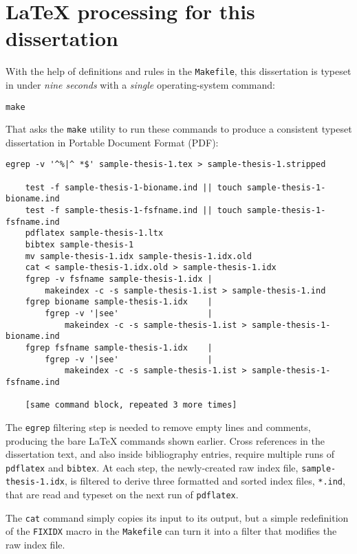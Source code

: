 
\chapter* {\LaTeX{} processing for this dissertation}

With the help of definitions and rules in the \texttt{Makefile}, this
dissertation is typeset in under \emph{nine seconds} with a \emph{single}
operating-system command:

\begin{Verbatim}[formatcom = \color{blue}]
    make
\end{Verbatim}

\noindent
That asks the \texttt{make} utility to run these commands to produce a
consistent typeset dissertation in Portable Document Format (PDF):

\begin{Verbatim}[formatcom = \color{blue}]
    egrep -v '^%|^ *$' sample-thesis-1.tex > sample-thesis-1.stripped

    test -f sample-thesis-1-bioname.ind || touch sample-thesis-1-bioname.ind
    test -f sample-thesis-1-fsfname.ind || touch sample-thesis-1-fsfname.ind
    pdflatex sample-thesis-1.ltx
    bibtex sample-thesis-1
    mv sample-thesis-1.idx sample-thesis-1.idx.old
    cat < sample-thesis-1.idx.old > sample-thesis-1.idx
    fgrep -v fsfname sample-thesis-1.idx |
        makeindex -c -s sample-thesis-1.ist > sample-thesis-1.ind
    fgrep bioname sample-thesis-1.idx    |
        fgrep -v '|see'                  |
            makeindex -c -s sample-thesis-1.ist > sample-thesis-1-bioname.ind
    fgrep fsfname sample-thesis-1.idx    |
        fgrep -v '|see'                  |
            makeindex -c -s sample-thesis-1.ist > sample-thesis-1-fsfname.ind

    [same command block, repeated 3 more times]
\end{Verbatim}

\noindent
The \texttt{egrep} filtering step is needed to remove empty lines and
comments, producing the bare \LaTeX{} commands shown earlier.  Cross
references in the dissertation text, and also inside bibliography
entries, require multiple runs of \texttt{pdflatex} and
\texttt{bibtex}.  At each step, the newly-created raw index file,
\texttt{sample-thesis-1.idx}, is filtered to derive three formatted
and sorted index files, \texttt{*.ind}, that are read and typeset
on the next run of \texttt{pdflatex}.

The \texttt{cat} command simply copies its input to its output, but a
simple redefinition of the \texttt{FIXIDX} macro in the
\texttt{Makefile} can turn it into a filter that modifies the raw
index file.

